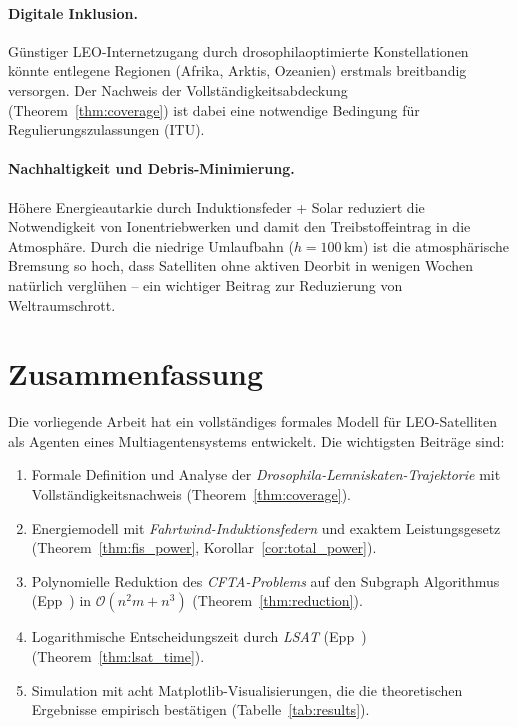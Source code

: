 ﻿\documentclass[a4paper,12pt]{article}
\theoremstyle{definition}
\begin{document}
\paragraph{Digitale Inklusion.}
G\"unstiger LEO-Internetzugang durch drosophilaoptimierte Konstellationen
k\"onnte entlegene Regionen (Afrika, Arktis, Ozeanien) erstmals
breitbandig versorgen.
Der Nachweis der Vollst\"andigkeitsabdeckung (Theorem~\ref{thm:coverage})
ist dabei eine notwendige Bedingung f\"ur Regulierungszulassungen (ITU).

\paragraph{Nachhaltigkeit und Debris-Minimierung.}
H\"ohere Energieautarkie durch Induktionsfeder + Solar reduziert die
Notwendigkeit von Ionentriebwerken und damit den Treibstoffeintrag
in die Atmosph\"are.
Durch die niedrige Umlaufbahn ($h = 100$\,km) ist die atmosph\"arische
Bremsung so hoch, dass Satelliten ohne aktiven Deorbit
in wenigen Wochen nat\"urlich vergl\"uhen -- ein wichtiger Beitrag
zur Reduzierung von Weltraumschrott.

\section{Zusammenfassung}

Die vorliegende Arbeit hat ein vollst\"andiges formales Modell f\"ur
LEO-Satelliten als Agenten eines Multiagentensystems entwickelt.
Die wichtigsten Beitr\"age sind:
\begin{enumerate}
  \item Formale Definition und Analyse der \emph{Drosophila-Lemniskaten-Trajektorie}
    mit Vollst\"andigkeitsnachweis (Theorem~\ref{thm:coverage}).
  \item Energiemodell mit \emph{Fahrtwind-Induktionsfedern} und exaktem
    Leistungsgesetz (Theorem~\ref{thm:fis_power}, Korollar~\ref{cor:total_power}).
  \item Polynomielle Reduktion des \emph{CFTA-Problems} auf den Subgraph Algorithmus
    (Epp~\cite{Epp2026}) in $\mathcal{O}(n^2 m + n^3)$ (Theorem~\ref{thm:reduction}).
  \item Logarithmische Entscheidungszeit durch \emph{LSAT} (Epp~\cite{Epp2026lsat})
    (Theorem~\ref{thm:lsat_time}).
  \item Simulation mit acht Matplotlib-Visualisierungen, die die theoretischen
    Ergebnisse empirisch best\"atigen (Tabelle~\ref{tab:results}).
\end{enumerate}
\end{document}
